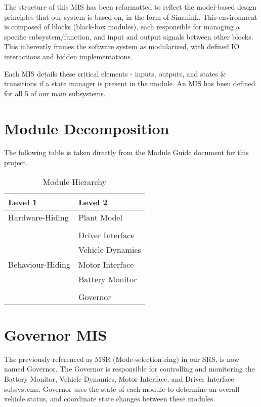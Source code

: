 \documentclass[12pt, titlepage]{article}
\begin{document}
The structure of this MIS has been reformatted to reflect the model-based design principles that our system is based on, in the form of Simulink. This environment is composed of blocks (black-box modules), each responsible for managing a specific subsystem/function, and input and output signals between other blocks. This inherently frames the software system as modularized, with defined IO interactions and hidden implementations.

Each MIS details these critical elements - inputs, outputs, and states \& transitions if a state manager is present in the module. An MIS has been defined for all 5 of our main subsystems.

\section{Module Decomposition}

The following table is taken directly from the Module Guide document for this project.

\begin{table}[h!]
\centering
\begin{tabular}{p{} p{}}
\toprule
\textbf{Level 1} & \textbf{Level 2}\\
\midrule

{Hardware-Hiding} & Plant Model \\
\midrule

\multirow{7}{0.3\textwidth}{Behaviour-Hiding} & \\
& Driver Interface\\
& Vehicle Dynamics\\
& Motor Interface\\
& Battery Monitor\\
\midrule

\multirow{3}{0.3\textwidth}{Software Decision} & \\
& Governor\\
\bottomrule

\end{tabular}
\caption{Module Hierarchy}
\label{TblMH}
\end{table}

\newpage

\section{Governor MIS} \label{mGov} 
The previously referenced as MSR (Mode-selection-ring) in our SRS, is now named Governor. The Governor is responsible for controlling and monitoring the Battery Monitor, Vehicle Dynamics, Motor Interface, and Driver Interface subsystems. Governor uses the state of each module to determine an overall vehicle status, and coordinate state changes between these modules.
\end{document}
